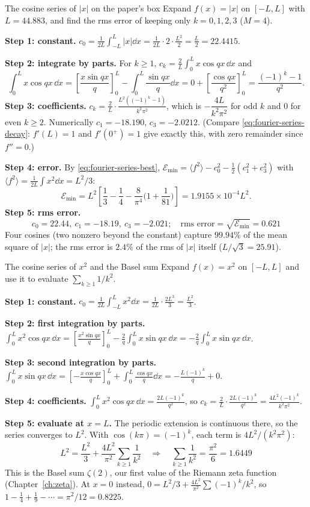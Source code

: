 \begin{sample}{The cosine series of $|x|$ on the paper's box}
Expand $f(x)=|x|$ on $[-L,L]$ with $L=44.883$, and find the rms error of keeping only $k=0,1,2,3$ ($M=4$).

\textbf{Step 1: constant.} $c_0=\frac1{2L}\int_{-L}^{L}|x|\dd x=\frac1{2L}\cdot2\cdot\frac{L^2}2=\frac L2=22.4415$.

\textbf{Step 2: integrate by parts.} For $k\ge1$, $c_k=\frac2L\int_0^Lx\cos qx\,\dd x$ and
\[
\int_0^Lx\cos qx\,\dd x=\left[\frac{x\sin qx}{q}\right]_0^L-\int_0^L\frac{\sin qx}{q}\dd x=0+\left[\frac{\cos qx}{q^2}\right]_0^L=\frac{(-1)^k-1}{q^2}.
\]
\textbf{Step 3: coefficients.} $c_k=\frac2L\cdot\frac{L^2((-1)^k-1)}{k^2\pi^2}$, which is $-\dfrac{4L}{k^2\pi^2}$ for odd $k$ and $0$ for even $k\ge2$. Numerically $c_1=-18.190$, $c_3=-2.0212$. (Compare \cref{eq:fourier-series-decay}: $f'(L)=1$ and $f'(0^+)=1$ give exactly this, with zero remainder since $f''=0$.)

\textbf{Step 4: error.} By \cref{eq:fourier-series-best}, $\mathcal{E}_{\min}=\langle f^2\rangle-c_0^2-\frac12(c_1^2+c_3^2)$ with $\langle f^2\rangle=\frac1{2L}\int x^2\dd x=L^2/3$:
\[
\mathcal{E}_{\min}=L^2\left[\frac13-\frac14-\frac{8}{\pi^4}\Big(1+\frac1{81}\Big)\right]=1.9155\times10^{-4}L^2 .
\]
\textbf{Step 5: rms error.}
\[
\boxed{c_0=22.44,\ c_1=-18.19,\ c_3=-2.021;\quad \text{rms error}=\sqrt{\mathcal{E}_{\min}}=0.621}
\]
Four cosines (two nonzero beyond the constant) capture $99.94\%$ of the mean square of $|x|$; the rms error is $2.4\%$ of the rms of $|x|$ itself ($L/\sqrt3=25.91$).
\end{sample}

\begin{sample}{The cosine series of $x^2$ and the Basel sum}
Expand $f(x)=x^2$ on $[-L,L]$ and use it to evaluate $\sum_{k\ge1}1/k^2$.

\textbf{Step 1: constant.} $c_0=\frac1{2L}\int_{-L}^{L}x^2\dd x=\frac1{2L}\cdot\frac{2L^3}{3}=\frac{L^2}3$.

\textbf{Step 2: first integration by parts.} $\int_0^Lx^2\cos qx\,\dd x=\left[\frac{x^2\sin qx}{q}\right]_0^L-\frac2q\int_0^Lx\sin qx\,\dd x=-\frac2q\int_0^Lx\sin qx\,\dd x$.

\textbf{Step 3: second integration by parts.} $\int_0^Lx\sin qx\,\dd x=\left[-\frac{x\cos qx}{q}\right]_0^L+\int_0^L\frac{\cos qx}{q}\dd x=-\frac{L(-1)^k}{q}+0$.

\textbf{Step 4: coefficients.} $\int_0^Lx^2\cos qx\,\dd x=\frac{2L(-1)^k}{q^2}$, so $c_k=\frac2L\cdot\frac{2L(-1)^k}{q^2}=\frac{4L^2(-1)^k}{k^2\pi^2}$.

\textbf{Step 5: evaluate at $x=L$.} The periodic extension is continuous there, so the series converges to $L^2$. With $\cos(k\pi)=(-1)^k$, each term is $4L^2/(k^2\pi^2)$:
\[
L^2=\frac{L^2}{3}+\frac{4L^2}{\pi^2}\sum_{k\ge1}\frac1{k^2}\quad\Longrightarrow\quad
\boxed{\sum_{k\ge1}\frac1{k^2}=\frac{\pi^2}{6}=1.6449}
\]
This is the Basel sum $\zeta(2)$, our first value of the Riemann zeta function (Chapter~\ref{ch:zeta}). At $x=0$ instead, $0=L^2/3+\frac{4L^2}{\pi^2}\sum(-1)^k/k^2$, so $1-\frac14+\frac19-\cdots=\pi^2/12=0.8225$.
\end{sample}

